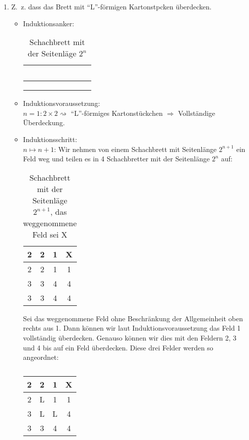\documentclass[12pt,a4paper]{report}
\begin{document}
\begin{enumerate}
	\item Z.~z. dass das Brett mit \enquote{L}-förmigen Kartonstpcken überdecken.
	\begin{itemize}
		\item Induktionsanker:
			\begin{table}[H]
				\centering
				\begin{tabular}{|c|c|c|c|}
					\hline
					~~&~~&~~&~~\\
					\hline
					&&&\\
					\hline
					&&&\\
					\hline
					&&&\\
					\hline
				\end{tabular}
				\caption{Schachbrett mit der Seitenläge $2^n$}
			\end{table}
		\item Induktionsvoraussetzung:\\
		$n=1: 2 \times 2 \rightsquigarrow$ \enquote{L}-förmiges Kartonstückchen $\Rightarrow$ Vollständige Überdeckung.
		
		\item Induktionsschritt:\\
		$n\mapsto n+1$: Wir nehmen von einem Schachbrett mit Seitenlänge $2^{n+1}$ ein Feld weg und teilen es in 4 Schachbretter mit der Seitenlänge $2^n$ auf:
		\begin{table}[H]
			\centering
			\begin{tabular}{|c|c||c|c|}
				\hline
				2 & 2 & 1 & X \\
				\hline
				2 & 2 & 1 & 1 \\
				\hline
				\hline
				3 & 3 & 4 & 4 \\
				\hline
				3 & 3 & 4 & 4 \\
				\hline
			\end{tabular}
			\caption{Schachbrett mit der Seitenläge $2^{n+1} $, das weggenommene Feld sei X}
		\end{table}
		Sei das weggenommene Feld ohne Beschränkung der Allgemeinheit oben rechts aus 1. Dann können wir laut Induktionsvoraussetzung das Feld 1 vollständig überdecken. Genauso können wir dies mit den Feldern 2, 3 und 4 bis auf ein Feld überdecken. Diese drei Felder werden so angeordnet:
		
		\begin{table}[H]
			\centering
			\begin{tabular}{|c|c||c|c|}
				\hline
				2 & 2 & 1 & X \\
				\hline
				2 & L & 1 & 1 \\
				\hline
				\hline
				3 & L & L & 4 \\
				\hline
				3 & 3 & 4 & 4 \\
				\hline
			\end{tabular}
			\caption{}
		\end{table}
		

\end{itemize}
\end{enumerate}
\end{document}
